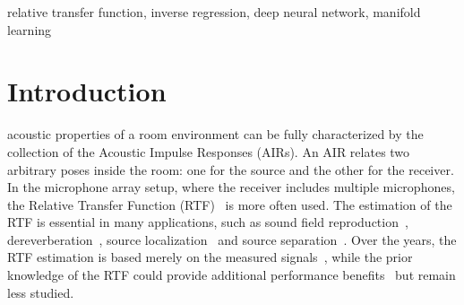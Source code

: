 \documentclass[journal]{IEEEtran}
\begin{document}
\begin{IEEEkeywords}
relative transfer function, inverse regression, deep neural network, manifold learning
\end{IEEEkeywords}

%
\IEEEpeerreviewmaketitle


\section{Introduction}


 acoustic properties of a room environment can be fully characterized by the collection of the Acoustic Impulse Responses (AIRs). An AIR relates two arbitrary poses inside the room: one for the source and the other for the receiver. In the microphone array setup, where the receiver includes multiple microphones, the Relative Transfer Function (RTF)~\cite{gannot2001signal} is more often used. The estimation of the RTF is essential in many applications, such as sound field reproduction~\cite{betlehem2005theory}, dereverberation~\cite{lin2007blind}, source localization~\cite{dele2013variational} and source separation~\cite{koldovsky2015spatial}. Over the years, the RTF estimation is based merely on the measured signals~\cite{cohen2004relative,talmon2009relative}, while the prior knowledge of the RTF could provide additional performance benefits~\cite{talmon2013relative} but remain less studied.
\end{document}
